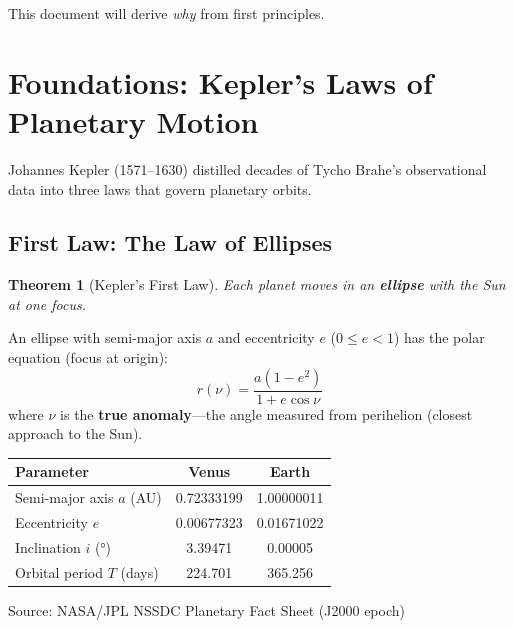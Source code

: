 \documentclass[11pt,letterpaper]{article}
\theoremstyle{definition}
\theoremstyle{plain}
\newtheorem{theorem}{Theorem}[section]
\theoremstyle{remark}
\begin{document}
This document will derive \textit{why} from first principles.


\section{Foundations: Kepler's Laws of Planetary Motion}
\label{sec:kepler}

Johannes Kepler (1571–1630) distilled decades of Tycho Brahe's
observational data into three laws that govern planetary orbits.

\subsection{First Law: The Law of Ellipses}

\begin{theorem}[Kepler's First Law]
Each planet moves in an \textbf{ellipse} with the Sun at one focus.
\end{theorem}

An ellipse with semi-major axis $a$ and eccentricity $e$
($0 \le e < 1$) has the polar equation (focus at origin):
\begin{equation}
  r(\nu) = \frac{a(1 - e^2)}{1 + e\cos\nu}
  \label{eq:ellipse}
\end{equation}
where $\nu$ is the \textbf{true anomaly}—the angle measured from
perihelion (closest approach to the Sun).

\begin{nasadata}
\begin{center}
\begin{tabular}{lcc}
  \toprule
  \textbf{Parameter} & \textbf{Venus} & \textbf{Earth} \\
  \midrule
  Semi-major axis $a$ (AU) & 0.72333199 & 1.00000011 \\
  Eccentricity $e$         & 0.00677323 & 0.01671022 \\
  Inclination $i$ (\si{\degree}) & 3.39471 & 0.00005 \\
  Orbital period $T$ (days) & 224.701 & 365.256 \\
  \bottomrule
\end{tabular}
\end{center}
\vspace{4pt}
\small Source: NASA/JPL NSSDC Planetary Fact Sheet (J2000 epoch)
\end{nasadata}
\end{document}
